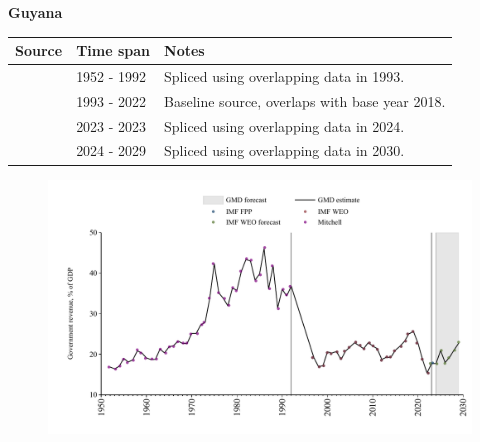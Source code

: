 \documentclass[12pt,a4paper,landscape]{article}
\begin{document}
\begin{adjustbox}{max totalsize={\paperwidth}{\paperheight},center}
\begin{minipage}[t][\textheight][t]{\textwidth}
\vspace*{0.5cm}
{}
\begin{center}
{\Large\bfseries Guyana}
\end{center}
\vspace{0.5cm}
\begin{table}[H]
\centering
\small
\begin{tabular}{|l|l|l|}
\hline
\textbf{Source} & \textbf{Time span} & \textbf{Notes} \\
\hline
\rowcolor{white}\cite{Mitchell}& 1952 - 1992 &Spliced using overlapping data in 1993.\\
\rowcolor{lightgray}\cite{IMF_WEO}& 1993 - 2022 &Baseline source, overlaps with base year 2018.\\
\rowcolor{white}\cite{IMF_FPP}& 2023 - 2023 &Spliced using overlapping data in 2024.\\
\rowcolor{lightgray}\cite{IMF_WEO_forecast}& 2024 - 2029 &Spliced using overlapping data in 2030.\\
\hline
\end{tabular}
\end{table}
\begin{figure}[H]
\centering
\includegraphics[width=\textwidth,height=0.6\textheight,keepaspectratio]{graphs/GUY_govrev_GDP.pdf}
\end{figure}
\end{minipage}
\end{adjustbox}
\end{document}
